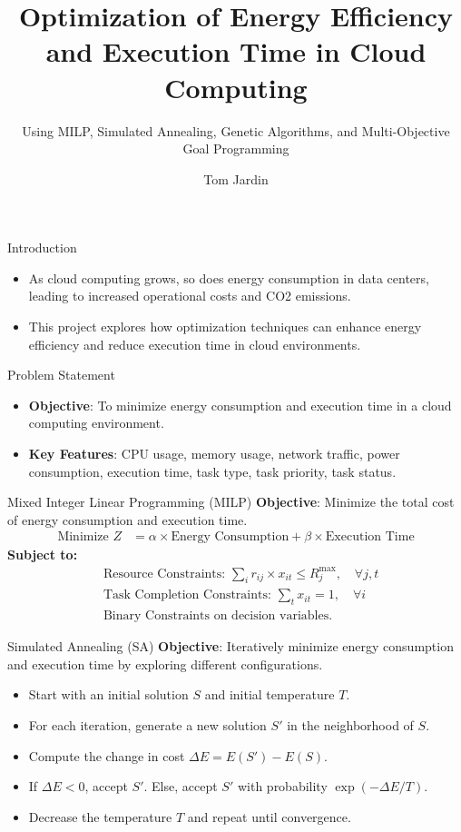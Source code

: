 \documentclass{beamer}
\title{Optimization of Energy Efficiency and Execution Time in Cloud Computing}
\subtitle{Using MILP, Simulated Annealing, Genetic Algorithms, and Multi-Objective Goal Programming}
\author{Tom Jardin}
\date{}
\begin{document}
\frame{\titlepage}

\begin{frame}{Introduction}
    \begin{itemize}
        \item As cloud computing grows, so does energy consumption in data centers, leading to increased operational costs and CO2 emissions.
        \item This project explores how optimization techniques can enhance energy efficiency and reduce execution time in cloud environments.
    \end{itemize}
\end{frame}

\begin{frame}{Problem Statement}
    \begin{itemize}
        \item \textbf{Objective}: To minimize energy consumption and execution time in a cloud computing environment.
        \item \textbf{Key Features}: CPU usage, memory usage, network traffic, power consumption, execution time, task type, task priority, task status.
    \end{itemize}
\end{frame}

\begin{frame}{Mixed Integer Linear Programming (MILP)}
    \textbf{Objective}: Minimize the total cost of energy consumption and execution time.
    \begin{align*}
        \text{Minimize } Z &= \alpha \times \text{Energy Consumption} + \beta \times \text{Execution Time}
    \end{align*}
    \textbf{Subject to:}
    \begin{align*}
        &\text{Resource Constraints: } \sum_{i} r_{ij} \times x_{it} \leq R_{j}^{\text{max}}, \quad \forall j, t \\
        &\text{Task Completion Constraints: } \sum_{t} x_{it} = 1, \quad \forall i \\
        &\text{Binary Constraints on decision variables.}
    \end{align*}
\end{frame}

\begin{frame}{Simulated Annealing (SA)}
    \textbf{Objective}: Iteratively minimize energy consumption and execution time by exploring different configurations.
    \begin{itemize}
        \item Start with an initial solution \(S\) and initial temperature \(T\).
        \item For each iteration, generate a new solution \(S'\) in the neighborhood of \(S\).
        \item Compute the change in cost \(\Delta E = E(S') - E(S)\).
        \item If \(\Delta E < 0\), accept \(S'\). Else, accept \(S'\) with probability \(\exp(-\Delta E / T)\).
        \item Decrease the temperature \(T\) and repeat until convergence.
    \end{itemize}
\end{frame}
\end{document}
